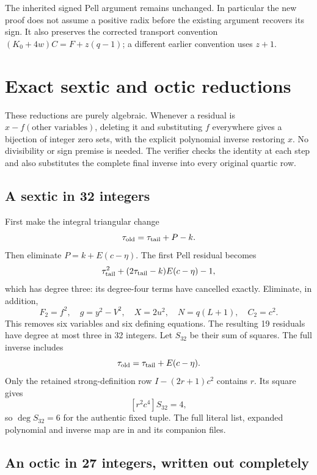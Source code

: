 \documentclass[11pt]{article}
\theoremstyle{definition}\newtheorem{definition}[theorem]{Definition}
\theoremstyle{remark}\newtheorem{remark}[theorem]{Remark}
\begin{document}
The inherited signed Pell argument remains unchanged. In particular the
new proof does not assume a positive radix before the existing argument
recovers its sign. It also preserves the corrected transport convention
$(K_0+4w)C=F+z(q-1)$; a different earlier convention uses $z+1$.

\section{Exact sextic and octic reductions}
\label{sec:elimination}

These reductions are purely algebraic. Whenever a residual is
$x-f(\text{other variables})$, deleting it and substituting $f$ everywhere
gives a bijection of integer zero sets, with the explicit polynomial
inverse restoring $x$. No divisibility or sign premise is needed.
The verifier checks the identity at each step and also substitutes the
complete final inverse into every original quartic row.

\subsection{A sextic in 32 integers}

First make the integral triangular change
\[
 \tau_{\rm old}=\tau_{\rm tail}+P-k.
\]
Then eliminate $P=k+E(c-\eta)$. The first Pell residual becomes
\[
 \tau_{\rm tail}^2+(2\tau_{\rm tail}-k)E(c-\eta)-1,
\]
which has degree three: its degree-four terms have cancelled exactly.
Eliminate, in addition,
\[
 F_2=f^2,\quad g=y^2-V^2,\quad X=2u^2,
 \quad N=q(L+1),\quad C_2=c^2.
\]
This removes six variables and six defining equations. The resulting 19
residuals have degree at most three in 32 integers. Let $S_{32}$ be their
sum of squares. The full inverse includes
\[
 \tau_{\rm old}=\tau_{\rm tail}+E(c-\eta).
\]
Only the retained strong-definition row
$I-(2r+1)c^2$ contains $r$. Its square gives
\[
 [r^2c^4]S_{32}=4,
\]
so $\deg S_{32}=6$ for the authentic fixed tuple. The full literal list,
expanded polynomial and inverse map are in
 and its companion files.

\subsection{An octic in 27 integers, written out completely}
\end{document}
